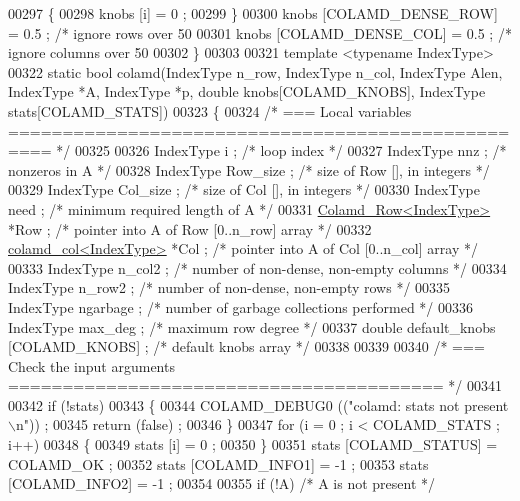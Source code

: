 \begin{DoxyCode}
00297   \{
00298     knobs [i] = 0 ;
00299   \}
00300   knobs [COLAMD\_DENSE\_ROW] = 0.5 ;  \textcolor{comment}{/* ignore rows over 50%
00301   knobs [COLAMD\_DENSE\_COL] = 0.5 ;  \textcolor{comment}{/* ignore columns over 50%
00302 \}
00303 
00321 \textcolor{keyword}{template} <\textcolor{keyword}{typename} IndexType>
00322 \textcolor{keyword}{static} \textcolor{keywordtype}{bool} colamd(IndexType n\_row, IndexType n\_col, IndexType Alen, IndexType *A, IndexType *p, \textcolor{keywordtype}{double} 
      knobs[COLAMD\_KNOBS], IndexType stats[COLAMD\_STATS])
00323 \{
00324   \textcolor{comment}{/* === Local variables ================================================== */}
00325   
00326   IndexType i ;     \textcolor{comment}{/* loop index */}
00327   IndexType nnz ;     \textcolor{comment}{/* nonzeros in A */}
00328   IndexType Row\_size ;    \textcolor{comment}{/* size of Row [], in integers */}
00329   IndexType Col\_size ;    \textcolor{comment}{/* size of Col [], in integers */}
00330   IndexType need ;      \textcolor{comment}{/* minimum required length of A */}
00331   \hyperlink{structinternal_1_1_colamd___row}{Colamd\_Row<IndexType>} *Row ;   \textcolor{comment}{/* pointer into A of Row [0..n\_row] array */}
00332   \hyperlink{structinternal_1_1colamd__col}{colamd\_col<IndexType>} *Col ;   \textcolor{comment}{/* pointer into A of Col [0..n\_col] array */}
00333   IndexType n\_col2 ;    \textcolor{comment}{/* number of non-dense, non-empty columns */}
00334   IndexType n\_row2 ;    \textcolor{comment}{/* number of non-dense, non-empty rows */}
00335   IndexType ngarbage ;    \textcolor{comment}{/* number of garbage collections performed */}
00336   IndexType max\_deg ;   \textcolor{comment}{/* maximum row degree */}
00337   \textcolor{keywordtype}{double} default\_knobs [COLAMD\_KNOBS] ; \textcolor{comment}{/* default knobs array */}
00338   
00339   
00340   \textcolor{comment}{/* === Check the input arguments ======================================== */}
00341   
00342   \textcolor{keywordflow}{if} (!stats)
00343   \{
00344     COLAMD\_DEBUG0 ((\textcolor{stringliteral}{"colamd: stats not present\(\backslash\)n"})) ;
00345     \textcolor{keywordflow}{return} (\textcolor{keyword}{false}) ;
00346   \}
00347   \textcolor{keywordflow}{for} (i = 0 ; i < COLAMD\_STATS ; i++)
00348   \{
00349     stats [i] = 0 ;
00350   \}
00351   stats [COLAMD\_STATUS] = COLAMD\_OK ;
00352   stats [COLAMD\_INFO1] = -1 ;
00353   stats [COLAMD\_INFO2] = -1 ;
00354   
00355   \textcolor{keywordflow}{if} (!A)   \textcolor{comment}{/* A is not present */}
}}
\end{DoxyCode}
